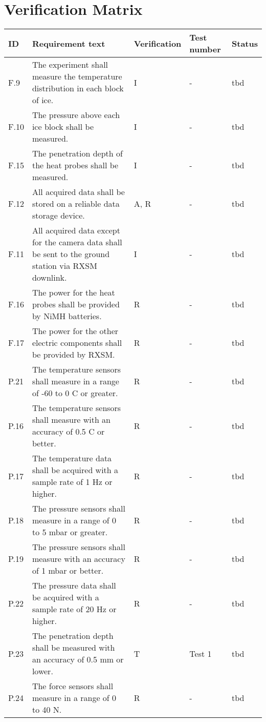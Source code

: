 \documentclass[11pt]{scrartcl}
\begin{document}
 \section{Verification Matrix}
 \begin{center}
	\begin{longtable}{| p{} | p{} | p{} | p{} | p{} |}
		\hline
		ID & Requirement text & Verification & Test number & Status \\
		\hline
		F.9 & The experiment shall measure the temperature distribution in each block of ice. & I & - & tbd \\
		F.10 & The pressure above each ice block shall be measured. & I & - & tbd \\
		F.15 & The penetration depth of the heat probes shall be measured. & I & - & tbd \\
		F.12 & All acquired data shall be stored on a reliable data storage device. & A, R & - & tbd \\
		F.11 & All acquired data except for the camera data shall be sent to the ground station via RXSM downlink. & I & - & tbd \\
		F.16 & The power for the heat probes shall be provided by NiMH batteries. & R & - & tbd \\
		F.17 & The power for the other electric components shall be provided by RXSM. & R & - & tbd \\
		\hline
		P.21 & The temperature sensors shall measure in a range of -60 to 0 \textdegree C or greater. & R & - & tbd \\
		P.16 & The temperature sensors shall measure with an accuracy of 0.5 \textdegree C or better. & R & - & tbd \\
		P.17 & The temperature data shall be acquired with a sample rate of 1 Hz or higher. & R & - & tbd \\
		P.18 & The pressure sensors shall measure in a range of 0 to 5 mbar or greater. & R & - & tbd \\
		P.19 & The pressure sensors shall measure with an accuracy of 1 mbar or better. & R & - & tbd \\
		P.22 & The pressure data shall be acquired with a sample rate of 20 Hz or higher\textsl{}. & R & - & tbd \\
		P.23 & The penetration depth shall be measured with an accuracy of 0.5 mm or lower. & T & Test 1 & tbd \\
		P.24 & The force sensors shall measure in a range of 0 to 40 N. & R & - & tbd \\

\end{longtable}
\end{center}
\end{document}
